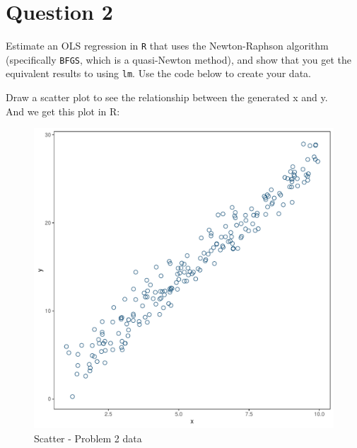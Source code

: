 \documentclass{article} %
\begin{document}
\section*{Question 2}
\noindent Estimate an OLS regression in \texttt{R} that uses the Newton-Raphson algorithm (specifically \texttt{BFGS}, which is a quasi-Newton method), and show that you get the equivalent results to using \texttt{lm}. Use the code below to create your data.
\vspace{.5cm}
 
\vspace{.3cm}
\noindent Draw a scatter plot to see the relationship between the generated x and y. \\
 
\vspace{.3cm}
\noindent And we get this plot in R: \\
\newpage
\begin{figure}[h]
	\centering
	\includegraphics[scale=.5]{q2_plot1.pdf} 
	\caption{Scatter - Problem 2 data}
\end{figure}
\noindent 
\end{document}
